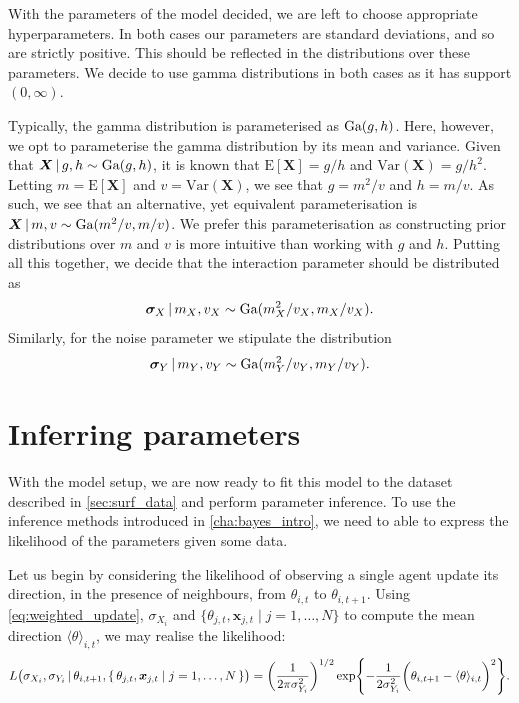 With the parameters of the model decided, we are left to choose appropriate hyperparameters. In both cases our parameters are standard deviations, and so are strictly positive. This should be reflected in the distributions over these parameters. We decide to use gamma distributions in both cases as it has support $(0, \infty)$.

Typically, the gamma distribution is parameterised as $\textrm{Ga}(g, h)$. Here, however, we opt to parameterise the gamma distribution by its mean and variance. Given that $\bm{X} \,|\, g, h \sim \textrm{Ga}(g, h)$, it is known that $\textrm{E}[\bm{X}] = g / h$ and $\textrm{Var}(\bm{X}) = g/h^2$. Letting $m = \textrm{E}[\bm{X}]$ and $v =\textrm{Var}(\bm{X})$, we see that $g = m^2 / v$ and $h = m / v$. As such, we see that an alternative, yet equivalent parameterisation is $\bm{X} \,|\, m, v \sim \textrm{Ga}(m^2 / v, m / v)$. We prefer this parameterisation as constructing prior distributions over $m$ and $v$ is more intuitive than working with $g$ and $h$. Putting all this together, we decide that the interaction parameter should be distributed as
\begin{equation}
	\label{eq:x_hypers}
	\bm{\sigma}_X \,|\, m_X, v_X \sim \textrm{Ga}(m_X^2 / v_X, m_X / v_X).
\end{equation}
Similarly, for the noise parameter we stipulate the distribution
\begin{equation}
	\label{eq:y_hypers}
	\bm{\sigma}_Y \,|\, m_Y, v_Y \sim \textrm{Ga}(m_Y^2 / v_Y, m_Y / v_Y).
\end{equation}

\section{Inferring parameters}
\label{sec:vicsek_infer}

With the model setup, we are now ready to fit this model to the dataset described in \cref{sec:surf_data} and perform parameter inference. To use the inference methods introduced in \cref{cha:bayes_intro}, we need to able to express the likelihood of the parameters given some data. 

Let us begin by considering the likelihood of observing a single agent update its direction, in the presence of neighbours, from $\theta_{i, t}$ to $\theta_{i, t+1}$. Using \cref{eq:weighted_update}, $\sigma_{X_i}$ and $\{\theta_{j, t}, \bm{x}_{j, t} \mid j=1,\ldots,N\}$ to compute the mean direction $\langle \theta \rangle_{i, t}$, we may realise the likelihood:
\begin{equation}
\label{eq:simple_likelihood}
	L\big(\sigma_{X_i}, \sigma_{Y_i} \,|\, \theta_{i, t+1},  \{\,\theta_{j, t}, \bm{x}_{j, t} \mid j=1,\ldots,N\,\}\big) = \bigg( \frac{1}{2\pi\sigma_{Y_i}^2} \bigg)^{1/2} \exp{-\frac{1}{2\sigma_{Y_i}^2} \bigg(\theta_{i, t+1} - \langle \theta \rangle_{i, t}\bigg)^2 }.
\end{equation}

